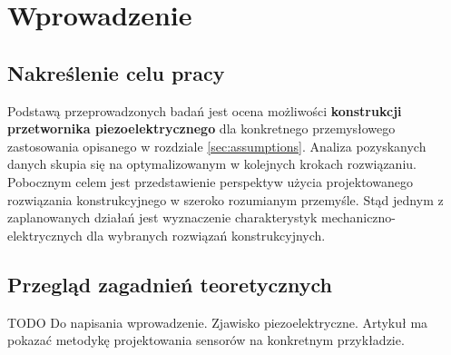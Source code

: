 \chapter{Wprowadzenie}
\label{sec:introduction}

\section{Nakreślenie celu pracy}
\label{sec:thesis_goal}
Podstawą przeprowadzonych badań jest ocena możliwości \textbf{konstrukcji przetwornika 
piezoelektrycznego} dla konkretnego przemysłowego zastosowania opisanego w rozdziale
\ref{sec:assumptions}. Analiza pozyskanych danych skupia się na optymalizowanym
w kolejnych krokach rozwiązaniu. Pobocznym celem jest przedstawienie perspektyw użycia
projektowanego rozwiązania konstrukcyjnego w szeroko rozumianym przemyśle. Stąd jednym
z zaplanowanych działań jest wyznaczenie charakterystyk mechaniczno-elektrycznych dla 
wybranych rozwiązań konstrukcyjnych. 

\section{Przegląd zagadnień teoretycznych}
\label{sec:theory}

TODO
Do napisania wprowadzenie. Zjawisko piezoelektryczne. 
Artykuł ma pokazać metodykę projektowania sensorów na konkretnym przykładzie.